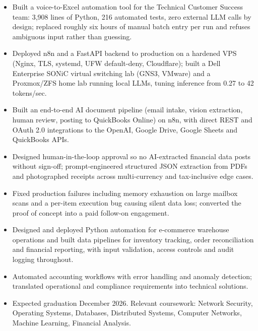 \documentclass{adelresume}
\begin{document}
\begin{itemize}
  \item Built a voice-to-Excel automation tool for the Technical Customer Success team: 3,908 lines of Python, 216 automated tests, zero external LLM calls by design; replaced roughly six hours of manual batch entry per run and refuses ambiguous input rather than guessing.
  \item Deployed n8n and a FastAPI backend to production on a hardened VPS (Nginx, TLS, systemd, UFW default-deny, Cloudflare); built a Dell Enterprise SONiC virtual switching lab (GNS3, VMware) and a Proxmox/ZFS home lab running local LLMs, tuning inference from 0.27 to 42 tokens/sec.
\end{itemize}

\begin{itemize}
  \item Built an end-to-end AI document pipeline (email intake, vision extraction, human review, posting to QuickBooks Online) on n8n, with direct REST and OAuth 2.0 integrations to the OpenAI, Google Drive, Google Sheets and QuickBooks APIs.
  \item Designed human-in-the-loop approval so no AI-extracted financial data posts without sign-off; prompt-engineered structured JSON extraction from PDFs and photographed receipts across multi-currency and tax-inclusive edge cases.
  \item Fixed production failures including memory exhaustion on large mailbox scans and a per-item execution bug causing silent data loss; converted the proof of concept into a paid follow-on engagement.
\end{itemize}

\begin{itemize}
  \item Designed and deployed Python automation for e-commerce warehouse operations and built data pipelines for inventory tracking, order reconciliation and financial reporting, with input validation, access controls and audit logging throughout.
  \item Automated accounting workflows with error handling and anomaly detection; translated operational and compliance requirements into technical solutions.
\end{itemize}

\begin{itemize}
  \item Expected graduation December 2026. Relevant coursework: Network Security, Operating Systems, Databases, Distributed Systems, Computer Networks, Machine Learning, Financial Analysis.
\end{itemize}
\end{document}
